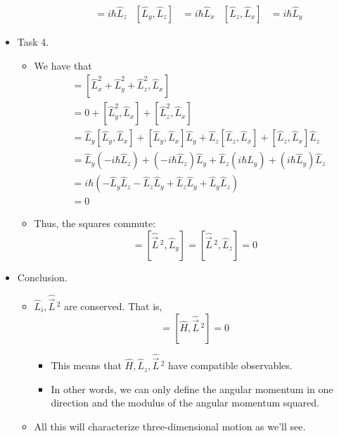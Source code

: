 \documentclass[../notes.tex]{subfiles}
\begin{document}
\begin{itemize}
\begin{itemize}
\begin{align*}
            [\hat{L}_x,\hat{L}_y] &= i\hbar\hat{L}_z&
            [\hat{L}_y,\hat{L}_z] &= i\hbar\hat{L}_x&
            [\hat{L}_z,\hat{L}_x] &= i\hbar\hat{L}_y
        \end{align*}
    \end{itemize}
    \item Task 4.
    \begin{itemize}
        \item We have that
        \begin{align*}
            [\hat{\vec{L}}{\,}^2,\hat{L}_x] &= [\hat{L}_x^2+\hat{L}_y^2+\hat{L}_z^2,\hat{L}_x]\\
            &= 0+[\hat{L}_y^2,\hat{L}_x]+[\hat{L}_z^2,\hat{L}_x]\\
            &= \hat{L}_y[\hat{L}_y,\hat{L}_x]+[\hat{L}_y,\hat{L}_x]\hat{L}_y+\hat{L}_z[\hat{L}_z,\hat{L}_x]+[\hat{L}_z,\hat{L}_x]\hat{L}_z\\
            &= \hat{L}_y(-i\hbar\hat{L}_z)+(-i\hbar\hat{L}_z)\hat{L}_y+\hat{L}_z(i\hbar\hat{L}_y)+(i\hbar\hat{L}_y)\hat{L}_z\\
            &= i\hbar(-\hat{L}_y\hat{L}_z-\hat{L}_z\hat{L}_y+\hat{L}_z\hat{L}_y+\hat{L}_y\hat{L}_z)\\
            &= 0
        \end{align*}
        \item Thus, the squares commute:
        \begin{equation*}
            [\hat{\vec{L}}{\,}^2,\hat{L}_x] = [\hat{\vec{L}}{\,}^2,\hat{L}_y]
            = [\hat{\vec{L}}{\,}^2,\hat{L}_z]
            = 0
        \end{equation*}
    \end{itemize}
    \item Conclusion.
    \begin{itemize}
        \item $\hat{L}_i,\hat{\vec{L}}{\,}^2$ are conserved. That is,
        \begin{equation*}
            [\hat{H},\hat{L}_i] = [\hat{H},\hat{\vec{L}}{\,}^2]
            = 0
        \end{equation*}
        \begin{itemize}
            \item This means that $\hat{H},\hat{L}_z,\hat{\vec{L}}{\,}^2$ have compatible observables.
            \item In other words, we can only define the angular momentum in one direction and the modulus of the angular momentum squared.
        \end{itemize}
        \item All this will characterize three-dimensional motion as we'll see.
    \end{itemize}
\end{itemize}
\end{document}
